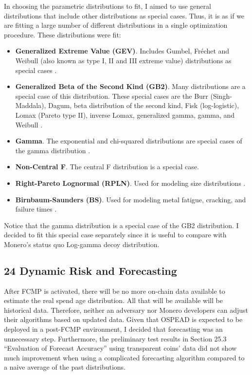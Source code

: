 \documentclass[english]{article}
\begin{document}
In choosing the parametric distributions to fit, I aimed to use general
distributions that include other distributions as special cases. Thus,
it is as if we are fitting a large number of different distributions
in a single optimization procedure. These distributions were fit:
\begin{itemize}
\item \textbf{Generalized Extreme Value (GEV)}. Includes Gumbel, Fr{\'e}chet
and Weibull (also known as type I, II and III extreme value) distributions
as special cases \cite{Coles_2001}. 
\item \textbf{Generalized Beta of the Second Kind (GB2)}. Many distributions
are a special case of this distribution. These special cases are the
Burr (Singh-Maddala), Dagum, beta distribution of the second kind,
Fisk (log-logistic), Lomax (Pareto type II), inverse Lomax, generalized
gamma, gamma, and Weibull \cite{Kleiber_2003}. 
\item \textbf{Gamma}. The exponential and chi-squared distributions are
special cases of the gamma distribution \cite{Kleiber_2003}. 
\item \textbf{Non-Central F}. The central F distribution is a special case.
\item \textbf{Right-Pareto Lognormal (RPLN)}. Used for modeling size distributions
\cite{ReedJorgensen2004}.
\item \textbf{Birnbaum-Saunders (BS)}. Used for modeling metal fatigue,
cracking, and failure times \cite{Birnbaum_Saunders_1969}.
\end{itemize}
Notice that the gamma distribution is a special case of the GB2 distribution.
I decided to fit this special case separately since it is useful to
compare with Monero's status quo Log-gamma decoy distribution.

\subsection*{24 Dynamic Risk and Forecasting}

After FCMP is activated, there will be no more on-chain data available
to estimate the real spend age distribution. All that will be available
will be historical data. Therefore, neither an adversary nor Monero
developers can adjust their algorithms based on updated data. Given
that OSPEAD is expected to be deployed in a post-FCMP environment,
I decided that forecasting was an unnecessary step. Furthermore, the
preliminary test results in Section 25.3 ``Evaluation of Forecast
Accuracy'' using transparent coins' data did not show much improvement
when using a complicated forecasting algorithm compared to a naive
average of the past distributions. 
\end{document}
